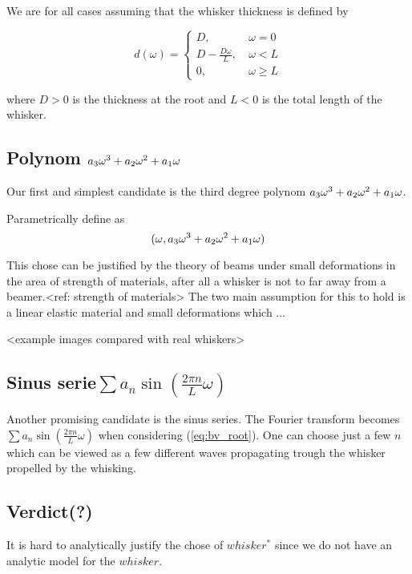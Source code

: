 We are for all cases assuming that the whisker thickness is defined by

\begin{equation}
    d(\omega) = \begin{cases}
        D,~& \omega=0\\
        D-\frac{D\omega}{L},~& \omega<L\\
        0,~& \omega\ge L
    \end{cases}
\end{equation}

where $D>0$ is the thickness at the root and $L<0$ is the total length of the
whisker.

\subsection{Polynom $a_3\omega^3+a_2\omega^2+a_1\omega$}

    Our first and simplest candidate is the third degree polynom $a_3\omega^3+a_2\omega^2+a_1\omega$.

    Parametrically define as
    \begin{equation}
        (\omega,a_3\omega^3+a_2\omega^2+a_1\omega)
    \end{equation}

    This chose can be justified by the theory of beams under small deformations 
    in the area of strength of materials, after all a whisker is not to far 
    away from a beamer.<ref: strength of materials> The two main assumption
    for this to hold is a linear elastic material and small deformations which
    ...

    <example images compared with real whiskers>

\subsection{Sinus serie$\sum{a_n\sin (\frac{2\pi n}{L}\omega)}$}
    Another promising candidate is the sinus series.
    The Fourier transform becomes $\sum{a_n\sin (\frac{2\pi n}{L}\omega)}$ when
    considering (\ref{eq:bv_root}). One can choose just a few $n$ which can be
    viewed as a few different waves propagating trough the whisker propelled by
    the whisking. 

\subsection{Verdict(?)}
    It is hard to analytically justify the chose of $whisker^*$ since we do not
    have an analytic model for the $whisker$.




